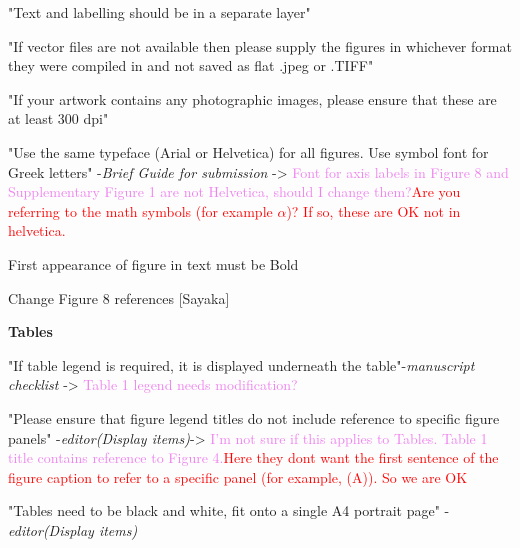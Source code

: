 \documentclass[11pt,letterpaper]{report}
\newcommand{\cmark}{\ding{51}}%
\newcommand{\done}{\rlap{$\square$}{\raisebox{2pt}{\large\hspace{1pt}\cmark}}%
\hspace{-2.5pt}}
\begin{document}
\begin{todolist}
    \begin{todolist}
        \item[\done] "Text and labelling should be in a separate layer"
        \item[\done] "If vector files are not available then please supply the figures in whichever format they were compiled in and not saved as flat .jpeg or .TIFF"
        \item[\done]"If your artwork contains any photographic images, please ensure that these are at least 300 dpi"
    \end{todolist}
\item[\done] "Use the same typeface (Arial or Helvetica) for all figures. Use symbol font for Greek letters" -\textit{Brief Guide for submission} -> \textcolor{violet}{Font for axis labels in Figure 8 and Supplementary Figure 1 are not Helvetica, should I change them?}\textcolor{red}{Are you referring to the math symbols (for example $\alpha$)? If so, these are OK not in helvetica.}
\item[\done] First appearance of figure in text must be Bold
\item[\done] Change Figure 8 references \textcolor{BlueGreen}{[Sayaka]}
\end{todolist}

\textbf{Tables}
\begin{todolist}
\item[\done]"If table legend is required, it is displayed underneath the table"-\textit{manuscript checklist} -> \textcolor{violet}{Table 1 legend needs modification?}
\item[\done] "Please ensure that figure legend titles do not include reference to specific figure panels" -\textit{editor(Display items)}-> \textcolor{violet}{I'm not sure if this applies to Tables. Table 1 title contains reference to Figure 4.}\textcolor{red}{Here they dont want the first sentence of the figure caption to refer to a specific panel (for example, (A)). So we are OK}
\item[\done] "Tables need to be black and white, fit onto a single A4 portrait page" -\textit{editor(Display items)}
\end{todolist}

\end{document}
